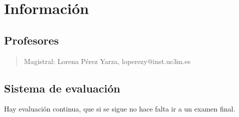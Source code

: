\documentclass[12pt, twoside, openright]{report} %
\begin{document}
\tableofcontents
\thispagestyle{fancy}

\listoffigures
\thispagestyle{fancy}

\listoftables
\thispagestyle{fancy}




\chapter{Información}\label{ch:informacion}
\section{Profesores}\label{sec:profesores}
\begin{quote}
	Magistral: Lorena Pérez Yarza, loperezy@inst.uc3m.es
\end{quote}

\section{Sistema de evaluación}\label{sec:sistema-de-evaluación}
Hay evaluación continua, que si se sigue no hace falta ir a un examen final.
\end{document}
